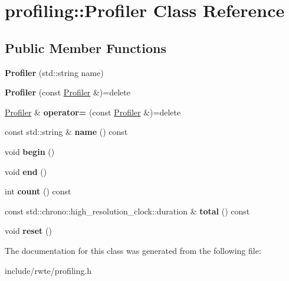 \hypertarget{classprofiling_1_1Profiler}{}\section{profiling\+::Profiler Class Reference}
\label{classprofiling_1_1Profiler}
\subsection*{Public Member Functions}
\begin{DoxyCompactItemize}
\item 
\mbox{\label{classprofiling_1_1Profiler_af1850e6b77dc4d0996a2ffd1cf02df17}} 
{\bfseries Profiler} (std\+::string name)
\item 
\mbox{\label{classprofiling_1_1Profiler_a153acb975c67bf6d98e05dbedce8dc7a}} 
{\bfseries Profiler} (const \mbox{\hyperlink{classprofiling_1_1Profiler}{Profiler}} \&)=delete
\item 
\mbox{\label{classprofiling_1_1Profiler_a6a96752068e8ba4be3cb3b67a3bacaad}} 
\mbox{\hyperlink{classprofiling_1_1Profiler}{Profiler}} \& {\bfseries operator=} (const \mbox{\hyperlink{classprofiling_1_1Profiler}{Profiler}} \&)=delete
\item 
\mbox{\label{classprofiling_1_1Profiler_a32d505f6da355bf9b2a5542e8b2fcb63}} 
const std\+::string \& {\bfseries name} () const
\item 
\mbox{\label{classprofiling_1_1Profiler_a9794f6236922602e150e69c5b7af46b8}} 
void {\bfseries begin} ()
\item 
\mbox{\label{classprofiling_1_1Profiler_ac3002a85dde7889e2f82999d3bffba83}} 
void {\bfseries end} ()
\item 
\mbox{\label{classprofiling_1_1Profiler_ac68f120314929b806ad908a4d9e0f584}} 
int {\bfseries count} () const
\item 
\mbox{\label{classprofiling_1_1Profiler_a6d7d2c54ff212ad8cf4d4f4ba7e58223}} 
const std\+::chrono\+::high\+\_\+resolution\+\_\+clock\+::duration \& {\bfseries total} () const
\item 
\mbox{\label{classprofiling_1_1Profiler_ab8eb6f5ef6ca208356414be0eaa754da}} 
void {\bfseries reset} ()
\end{DoxyCompactItemize}


The documentation for this class was generated from the following file\+:\begin{DoxyCompactItemize}
\item 
include/rwte/profiling.\+h\end{DoxyCompactItemize}
